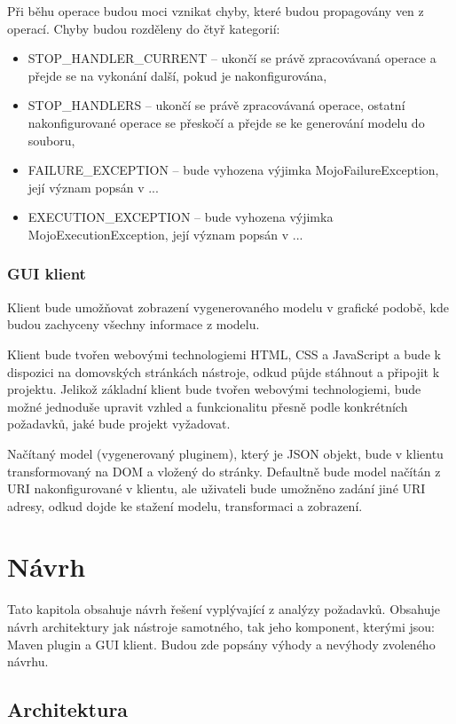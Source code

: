 \documentclass[11pt,twoside,a4paper]{book}
\begin{document}
Při běhu operace budou moci vznikat chyby, které budou propagovány ven z operací. Chyby
budou rozděleny do čtyř kategorií:

\begin{itemize}
  \item STOP\_HANDLER\_CURRENT – ukončí se právě zpracovávaná operace a přejde
  se na vykonání další, pokud je nakonfigurována,
  \item STOP\_HANDLERS – ukončí se právě zpracovávaná operace, ostatní 
  nakonfigurované operace se přeskočí a přejde se ke generování modelu do souboru,
  \item FAILURE\_EXCEPTION – bude vyhozena výjimka MojoFailureException, její
význam popsán v ...
  \item EXECUTION\_EXCEPTION – bude vyhozena výjimka MojoExecutionException,
  její význam popsán v ...
\end{itemize}

\subsection{GUI klient}

Klient bude umožňovat zobrazení vygenerovaného modelu v grafické podobě, kde budou
zachyceny všechny informace z modelu.

Klient bude tvořen webovými technologiemi HTML, CSS a JavaScript a bude k dispozici na
domovských stránkách nástroje, odkud půjde stáhnout a připojit k projektu. Jelikož základní
klient bude tvořen webovými technologiemi, bude možné jednoduše upravit vzhled a
funkcionalitu přesně podle konkrétních požadavků, jaké bude projekt vyžadovat.

Načítaný model (vygenerovaný pluginem), který je JSON objekt, bude v klientu
transformovaný na DOM a vložený do stránky. Defaultně bude model načítán z URI
nakonfigurované v klientu, ale uživateli bude umožněno zadání jiné URI adresy, odkud dojde
ke stažení modelu, transformaci a zobrazení.

\chapter{Návrh}

Tato kapitola obsahuje návrh řešení vyplývající z analýzy požadavků. Obsahuje návrh
architektury jak nástroje samotného, tak jeho komponent, kterými jsou: Maven plugin a GUI
klient. Budou zde popsány výhody a nevýhody zvoleného návrhu.

\section{Architektura}
\end{document}
